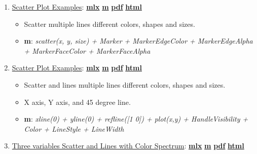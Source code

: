 \documentclass[
]{book}
\providecommand{\tightlist}{%
  \setlength{\itemsep}{0pt}\setlength{\parskip}{0pt}}
\begin{document}
\begin{enumerate}
\def\labelenumi{\arabic{enumi}.}
\tightlist
\item
  \href{https://fanwangecon.github.io/M4Econ/graph/main/htmlpdfm/fs_scatter.html}{Scatter Plot Examples}: \href{https://github.com/FanWangEcon/M4Econ/blob/master/graph/main/fs_scatter.mlx}{\textbf{mlx}} \textbar{} \href{https://github.com/FanWangEcon/M4Econ/blob/master/graph/main/htmlpdfm/fs_scatter.m}{\textbf{m}} \textbar{} \href{https://github.com/FanWangEcon/M4Econ/blob/master/graph/main/htmlpdfm/fs_scatter.pdf}{\textbf{pdf}} \textbar{} \href{https://fanwangecon.github.io/M4Econ/graph/main/htmlpdfm/fs_scatter.html}{\textbf{html}}

  \begin{itemize}
  \tightlist
  \item
    Scatter multiple lines different colors, shapes and sizes.
  \item
    \textbf{m}: \emph{scatter(x, y, size) + Marker + MarkerEdgeColor + MarkerEdgeAlpha + MarkerFaceColor + MarkerFaceAlpha}
  \end{itemize}
\item
  \href{https://fanwangecon.github.io/M4Econ/graph/main/htmlpdfm/fs_lines.html}{Scatter Plot Examples}: \href{https://github.com/FanWangEcon/M4Econ/blob/master/graph/main/fs_lines.mlx}{\textbf{mlx}} \textbar{} \href{https://github.com/FanWangEcon/M4Econ/blob/master/graph/main/htmlpdfm/fs_lines.m}{\textbf{m}} \textbar{} \href{https://github.com/FanWangEcon/M4Econ/blob/master/graph/main/htmlpdfm/fs_lines.pdf}{\textbf{pdf}} \textbar{} \href{https://fanwangecon.github.io/M4Econ/graph/main/htmlpdfm/fs_lines.html}{\textbf{html}}

  \begin{itemize}
  \tightlist
  \item
    Scatter and lines multiple lines different colors, shapes and sizes.
  \item
    X axis, Y axis, and 45 degree line.
  \item
    \textbf{m}: \emph{xline(0) + yline(0) + refline({[}1 0{]}) + plot(x,y) + HandleVisibility + Color + LineStyle + LineWidth}
  \end{itemize}
\item
  \href{https://fanwangecon.github.io/M4Econ/graph/main/htmlpdfm/fs_specline.html}{Three variables Scatter and Lines with Color Spectrum}: \href{https://github.com/FanWangEcon/M4Econ/blob/master/graph/main/fs_specline.mlx}{\textbf{mlx}} \textbar{} \href{https://github.com/FanWangEcon/M4Econ/blob/master/graph/main/htmlpdfm/fs_specline.m}{\textbf{m}} \textbar{} \href{https://github.com/FanWangEcon/M4Econ/blob/master/graph/main/htmlpdfm/fs_specline.pdf}{\textbf{pdf}} \textbar{} \href{https://fanwangecon.github.io/M4Econ/graph/main/htmlpdfm/fs_specline.html}{\textbf{html}}


\end{enumerate}
\end{document}
